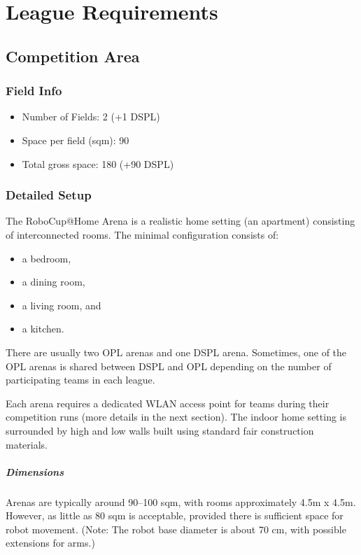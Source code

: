 \chapter{League Requirements}\label{chap:league-requirements}

\section{Competition Area}

\subsection{Field Info}
\begin{itemize}
    \item Number of Fields: 2 (+1 DSPL)
    \item Space per field (sqm): 90
    \item Total gross space: 180 (+90 DSPL)
\end{itemize}

\subsection{Detailed Setup}
The RoboCup@Home Arena is a realistic home setting (an apartment) consisting of interconnected rooms. The minimal configuration consists of:
\begin{itemize}
    \item a bedroom,
    \item a dining room,
    \item a living room, and
    \item a kitchen.
\end{itemize}

There are usually two OPL arenas and one DSPL arena. Sometimes, one of the OPL arenas is shared between DSPL and OPL depending on the number of participating teams in each league.

Each arena requires a dedicated WLAN access point for teams during their competition runs (more details in the next section). The indoor home setting is surrounded by high and low walls built using standard fair construction materials.

\paragraph{Dimensions} Arenas are typically around 90--100 sqm, with rooms approximately 4.5m x 4.5m. However, as little as 80 sqm is acceptable, provided there is sufficient space for robot movement. (Note: The robot base diameter is about 70 cm, with possible extensions for arms.)

